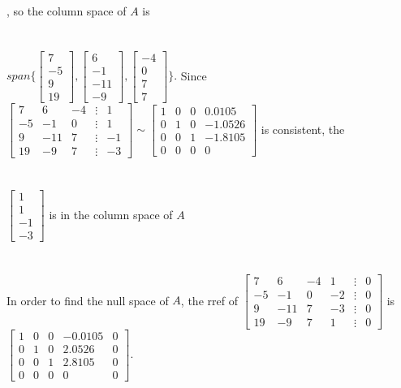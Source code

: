 \documentclass{article}
\begin{document}
, so the column space of $A$ is \\\\\\ $span\{\begin{bmatrix}7\\-5\\9\\19\end{bmatrix}, \begin{bmatrix}6\\-1\\-11\\-9\end{bmatrix}, \begin{bmatrix}-4\\0\\7\\7\end{bmatrix}\}.$
Since $\begin{bmatrix}7&6&-4&\vdots&1\\-5&-1&0&\vdots&1\\9&-11&7&\vdots&-1\\19&-9&7&\vdots&-3\end{bmatrix} \sim\begin{bmatrix}1&0&0&0.0105\\0&1&0&-1.0526\\0&0&1&-1.8105\\0&0&0&0\end{bmatrix}$ is consistent, the \\\\\\ $\begin{bmatrix}1\\1\\-1\\-3\end{bmatrix}$ is in the column space of $A$
\\\\\\
In order to find the null space of $A$, the rref of $\begin{bmatrix}7&6&-4&1&\vdots&0\\-5&-1&0&-2&\vdots&0\\9&-11&7&-3&\vdots&0\\19&-9&7&1&\vdots&0\end{bmatrix}$ is $\begin{bmatrix}1&0&0&-0.0105&0\\0&1&0&2.0526&0\\0&0&1&2.8105&0\\0&0&0&0&0\end{bmatrix}.$
\end{document}
